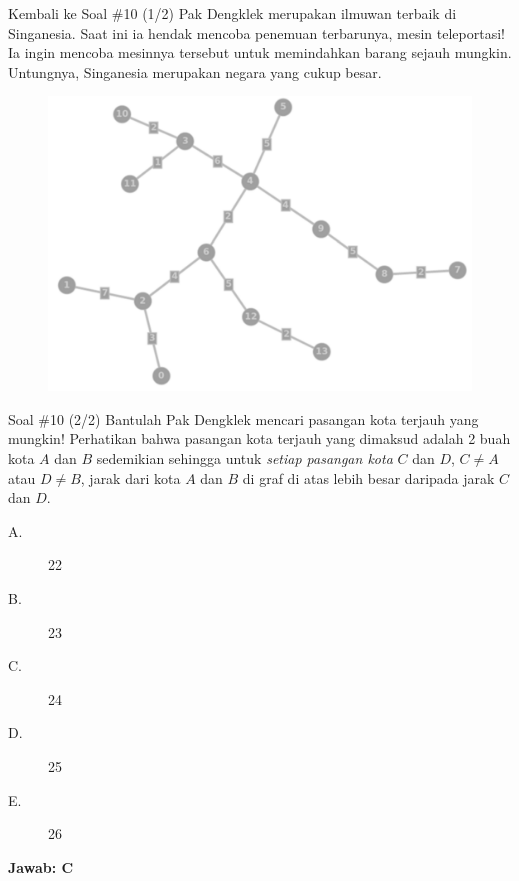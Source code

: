 \documentclass[english,t]{beamer}
\begin{document}
\begin{frame}{Kembali ke Soal \#10 (1/2)}
	Pak Dengklek merupakan ilmuwan terbaik di Singanesia. Saat ini ia hendak mencoba penemuan terbarunya, mesin teleportasi! Ia ingin mencoba mesinnya tersebut untuk memindahkan barang sejauh mungkin. Untungnya, Singanesia merupakan negara yang cukup besar.
	\begin{figure}[!ht]
		\centering
		\includegraphics[scale=.1675]{images/singanesia}
	\end{figure}
	
\end{frame}

\begin{frame}{Soal \#10 (2/2)}
	Bantulah Pak Dengklek mencari pasangan kota terjauh yang mungkin! Perhatikan bahwa pasangan kota terjauh yang dimaksud adalah 
	2 buah kota $A$ dan $B$ sedemikian sehingga untuk \textit{setiap pasangan kota} $C$ dan $D$, $C \neq A$ atau $D \neq B$, jarak dari kota $A$ dan $B$ di graf di atas lebih besar daripada jarak $C$ dan $D$.
	\begin{description}
		\item[A.] 22
		\item[B.] 23
		\item[C.] 24
		\item[D.] 25
		\item[E.] 26
	\end{description}		
	\pause \textbf{Jawab: C}		
\end{frame}

	
	
		
\end{document}
